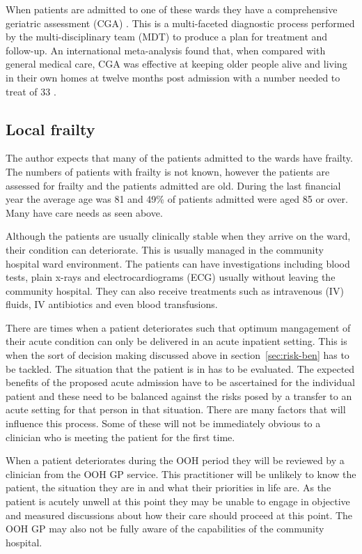 \documentclass
[
	12pt,
	a4paper,
	oneside,
]{report}
\begin{document}
When patients are admitted to one of these wards they have a comprehensive geriatric 
assessment (CGA) \parencite{bgs:14}. This is a multi-faceted diagnostic process
performed by the multi-disciplinary team (MDT) to produce a plan for treatment 
and follow-up.
An international meta-analysis found that, when compared with general medical care,
CGA was effective at keeping older people alive and living in their own homes at
twelve months post admission with a number needed to treat of 33 \parencite{ellis:11}.

\subsection{Local frailty}

The author expects that many of the patients admitted to the wards have frailty.
The numbers of patients with frailty is not known, however the patients are assessed 
for frailty and the patients admitted are old. During the last financial year the
average age was 81 and 49\% of patients admitted were aged 85 or over. Many have 
care needs as seen above.

Although the patients are usually clinically stable when they arrive on the ward,
their condition can deteriorate. This is usually managed in the community hospital
ward environment. The patients can have investigations including blood tests, plain
x-rays and electrocardiograms (ECG) usually without leaving the community hospital.
They can also receive treatments such as intravenous (IV) fluids, IV antibiotics
and even blood transfusions.

There are times when a patient deteriorates such that optimum mangagement of their
acute condition can only be delivered in an acute inpatient setting. This is when 
the sort of decision making discussed above in section~\ref{sec:risk-ben} has
to be tackled. The situation that the patient is in has to be evaluated. The 
expected benefits of the proposed acute admission have to be ascertained for the
individual patient and these need to be balanced against the risks posed by a transfer
to an acute setting for that person in that situation. There are many factors that 
will influence this process. Some of these will not be immediately obvious to a 
clinician who is meeting the patient for the first time.

When a patient deteriorates during the OOH period they will be reviewed by a clinician
from the OOH GP service. This practitioner will be unlikely to know the patient,
the situation they are in and what their priorities in life are. As the patient is
acutely unwell at this point they may be unable to engage in objective and measured
discussions about how their care should proceed at this point. The OOH GP may also
not be fully aware of the capabilities of the community hospital. 
\end{document}
